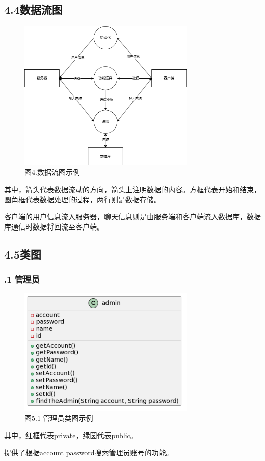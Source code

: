 \documentclass[24pt,a4paper]{article}%
\begin{document}
\subsection*{\songti 4.4数据流图}
\begin{figure}[H]
    \centering
    \includegraphics[width=0.75\textwidth]{images/dataStream.png}
    \caption*{图4.数据流图示例}
\end{figure}
其中，箭头代表数据流动的方向，箭头上注明数据的内容。方框代表开始和结束，圆角框代表数据处理的过程，两行则是数据存储。\par
客户端的用户信息流入服务器，聊天信息则是由服务端和客户端流入数据库，数据库通信时数据将回流至客户端。
\subsection*{\songti 4.5类图}
\subsubsection*{.1 管理员}
\begin{figure}[H]
    \centering
    \includegraphics[width=0.75\textwidth]{images/admin.png}
    \caption*{图5.1 管理员类图示例}
\end{figure}
其中，红框代表private，绿圆代表public。\par
提供了根据account password搜索管理员账号的功能。\par
\end{document}
